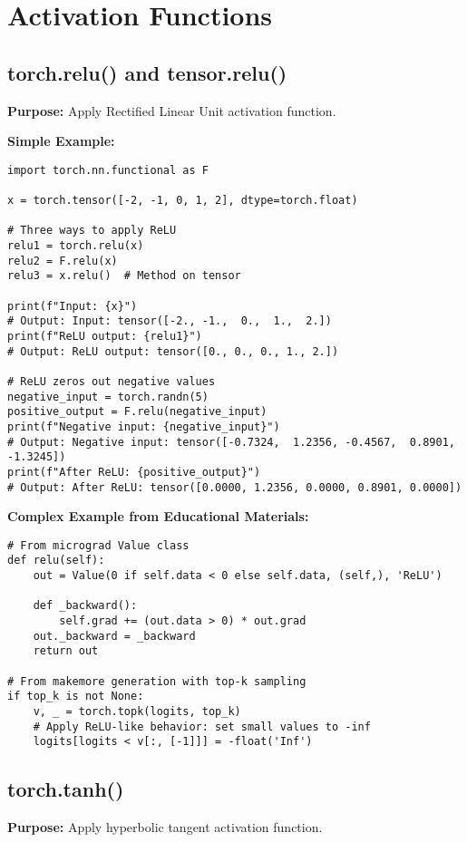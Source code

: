 \documentclass[11pt,a4paper]{book}
\begin{document}
\section{Activation Functions}

\subsection{torch.relu() and tensor.relu()}

\textbf{Purpose:} Apply Rectified Linear Unit activation function.

\textbf{Simple Example:}
\begin{verbatim}
import torch.nn.functional as F

x = torch.tensor([-2, -1, 0, 1, 2], dtype=torch.float)

# Three ways to apply ReLU
relu1 = torch.relu(x)
relu2 = F.relu(x)
relu3 = x.relu()  # Method on tensor

print(f"Input: {x}")
# Output: Input: tensor([-2., -1.,  0.,  1.,  2.])
print(f"ReLU output: {relu1}")
# Output: ReLU output: tensor([0., 0., 0., 1., 2.])

# ReLU zeros out negative values
negative_input = torch.randn(5)
positive_output = F.relu(negative_input)
print(f"Negative input: {negative_input}")
# Output: Negative input: tensor([-0.7324,  1.2356, -0.4567,  0.8901, -1.3245])
print(f"After ReLU: {positive_output}")
# Output: After ReLU: tensor([0.0000, 1.2356, 0.0000, 0.8901, 0.0000])
\end{verbatim}

\textbf{Complex Example from Educational Materials:}
\begin{verbatim}
# From micrograd Value class
def relu(self):
    out = Value(0 if self.data < 0 else self.data, (self,), 'ReLU')
    
    def _backward():
        self.grad += (out.data > 0) * out.grad
    out._backward = _backward
    return out

# From makemore generation with top-k sampling
if top_k is not None:
    v, _ = torch.topk(logits, top_k)
    # Apply ReLU-like behavior: set small values to -inf
    logits[logits < v[:, [-1]]] = -float('Inf')
\end{verbatim}

\subsection{torch.tanh()}

\textbf{Purpose:} Apply hyperbolic tangent activation function.
\end{document}
